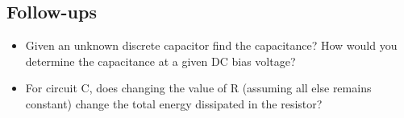 \documentclass[main.tex]{subfiles}
\begin{document}







\subsection{Follow-ups}
\begin{itemize}
    \item Given an unknown discrete capacitor find the capacitance? How would you determine the capacitance at a given DC bias voltage? %
    \item For circuit C, does changing the value of R (assuming all else remains constant) change the total energy dissipated in the resistor? %
\end{itemize}
\end{document}
